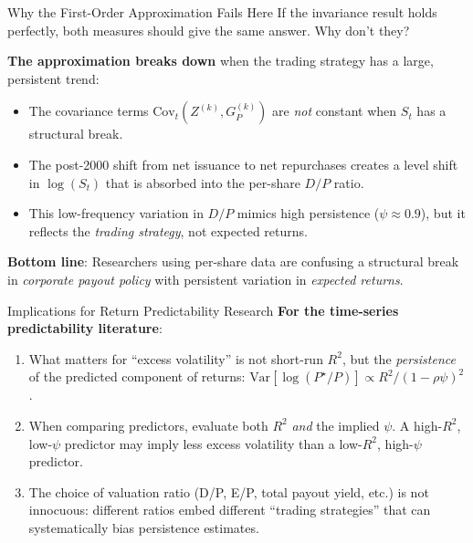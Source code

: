 \documentclass{beamer}
\begin{document}
\begin{frame}{Why the First-Order Approximation Fails Here}
	If the invariance result holds perfectly, both measures should give the same answer. Why don't they?

	\vspace{5pt}
	\textbf{The approximation breaks down} when the trading strategy has a large, persistent trend:
	\begin{itemize}
		\item The covariance terms $\text{Cov}_t(Z^{(k)}, G_P^{(k)})$ are \textit{not} constant when $S_t$ has a structural break.
		\item The post-2000 shift from net issuance to net repurchases creates a level shift in $\log(S_t)$ that is absorbed into the per-share $D/P$ ratio.
		\item This low-frequency variation in $D/P$ mimics high persistence ($\psi \approx 0.9$), but it reflects the \textit{trading strategy}, not expected returns.
	\end{itemize}

	\vspace{3pt}
	\textbf{Bottom line}: Researchers using per-share data are confusing a structural break in \textit{corporate payout policy} with persistent variation in \textit{expected returns}.
\end{frame}

\begin{frame}{Implications for Return Predictability Research}
	\textbf{For the time-series predictability literature}:
	\begin{enumerate}
		\item What matters for ``excess volatility'' is not short-run $R^2$, but the \textit{persistence} of the predicted component of returns: $\text{Var}[\log(P^\star/P)] \propto R^2 / (1-\rho\psi)^2$.
		\item When comparing predictors, evaluate both $R^2$ \textit{and} the implied $\psi$. A high-$R^2$, low-$\psi$ predictor may imply less excess volatility than a low-$R^2$, high-$\psi$ predictor.
		\item The choice of valuation ratio (D/P, E/P, total payout yield, etc.) is not innocuous: different ratios embed different ``trading strategies'' that can systematically bias persistence estimates.
	\end{enumerate}

\end{frame}
\end{document}
